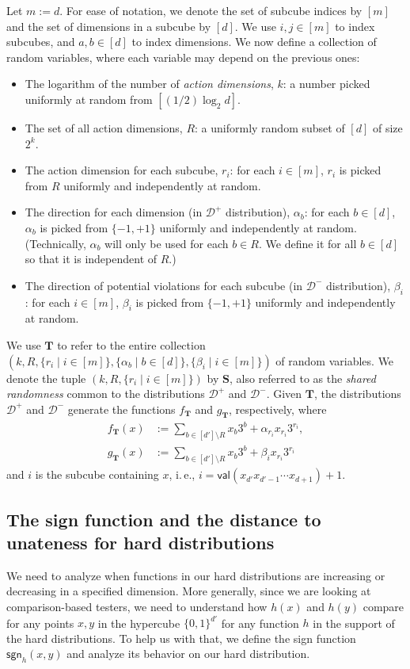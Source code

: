 \documentclass[11pt]{article}
\numberwithin{equation}{section}
\theoremstyle{definition}
\theoremstyle{plain}
\newcommand{\ie}{i.\,e.}
\newcommand{\bS}{\ensuremath{\mathbf{S}}}
\newcommand{\bT}{\ensuremath{\mathbf{T}}}
\newcommand{\Yes}{\ensuremath{\mathcal{D}^+}}
\newcommand{\No}{\ensuremath{\mathcal{D}^-}}
\newcommand{\dd}{\ensuremath{{d'}}}
\newcommand{\dec}{\mathsf{val}}
\newcommand{\sgn}{\mathsf{sgn}}
\begin{document}
Let $m:=d$. For ease of notation, we denote the set of subcube indices by $[m]$ and the set of dimensions in a subcube by $[d]$.
We use $i,j\in [m]$ to index subcubes,
and $a,b\in [d]$ to index dimensions.
We now define a collection of random variables, where each variable may depend on the previous ones:
\begin{itemize}
    \item The logarithm of the number of \emph{action dimensions}, $k$: a number picked uniformly at random from $\left[({1}/{2})\log_2 d \right]$.
    \item The set of all action dimensions, $R$: a uniformly random subset of $[d]$ of size $2^k$.
    \item The action dimension for each subcube, $r_i$: for each $i \in [m]$, $r_i$ is picked from $R$ uniformly and independently at random.
    \item The direction for each dimension (in $\Yes$ distribution), $\alpha_b$: for each $b \in [d]$, $\alpha_b$ is picked from $\{-1,+1\}$ uniformly and independently at random.
    (Technically, $\alpha_b$ will only be used for each $b \in R$. We define it for all $b \in [d]$ so that it is independent of $R$.)
    \item The direction of potential violations for each subcube (in $\No$ distribution), $\beta_i$: for each $i \in [m]$, $\beta_i$ is picked from $\{-1,+1\}$ uniformly and independently at random.
\end{itemize}


We use $\bT$ to refer to the entire collection
%
%
%
%
%
$(k, R, \{r_i \mid i \in [m]\}, \{\alpha_b \mid b \in [d]\}, \{\beta_i \mid i \in [m]\})$
%
of random variables.  %
We denote the tuple $(k,R,\{r_i \mid i \in [m]\})$ by $\bS$, also referred
%
%
to as the \emph{shared randomness} common to
the  %
%
%
%
distributions $\Yes$ and $\No$.
%
Given $\bT$, the distributions $\Yes$ and $\No$ generate
the  %
functions $f_{\bT}$
and $g_{\bT}$, respectively, %
where
\begin{align*}
f_{\bT}(x) &:=  \sum_{b \in [d'] \setminus R} x_b 3^b + \alpha_{r_i} x_{r_i}3^{r_i}, %
\\
g_{\bT}(x) &:=  \sum_{b \in [d'] \setminus R} x_b 3^b + \beta_i x_{r_i}3^{r_i} %
\end{align*}
and $i$ is the subcube containing $x$, \ie, $i = \dec(x_{d'}x_{d'-1}\cdots x_{d+1}) + 1$.


%
%
%
%
%
%
%
%



\subsection{The sign function and the distance to unateness for hard distributions} \label{sec:sgn-fn}
We need to analyze when functions in our hard distributions are increasing or decreasing in a specified dimension. More generally, since we are looking at comparison-based testers, we need to understand how $h(x)$ and $h(y)$ compare for any points $x,y$ in the hypercube $\{0,1\}^{\dd}$ for any function $h$ in the support of the hard distributions. To help us with that, we define the sign function $\sgn_h(x,y)$ and analyze its behavior on our hard distribution.
\end{document}
